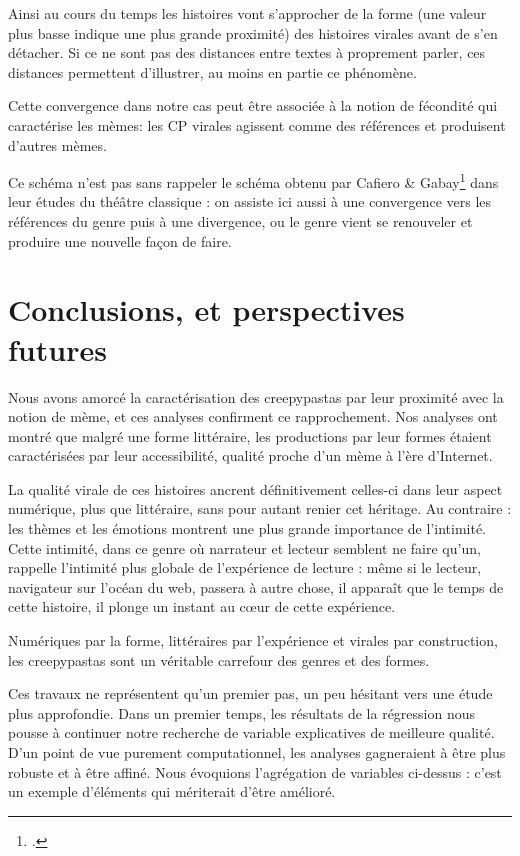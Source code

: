 \documentclass[12pt,a4paper,oneside,titlepage]{book} %
\begin{document}
Ainsi au cours du temps les histoires vont s'approcher de la forme (une valeur plus basse indique une plus grande proximité) des histoires virales avant de s'en détacher. Si ce ne sont pas des distances entre textes à proprement parler, ces distances permettent d'illustrer, au moins en partie ce phénomène. 

Cette convergence dans notre cas peut être associée à la notion de fécondité qui caractérise les mèmes: les CP virales agissent comme des références et produisent d'autres mèmes. 

Ce schéma n'est pas sans rappeler le schéma obtenu par Cafiero \& Gabay\footcite{cafiero_rise_nodate} dans leur études du théâtre classique : on assiste ici aussi à une convergence vers les références du genre puis à une divergence, ou le genre vient se renouveler et produire une nouvelle façon de faire.

\part{Conclusions, et perspectives futures}
Nous avons amorcé la caractérisation des creepypastas par leur proximité avec la notion de mème, et ces analyses confirment ce rapprochement. Nos analyses ont montré que malgré une forme littéraire, les productions par leur formes étaient caractérisées par leur accessibilité, qualité proche d'un mème à l'ère d'Internet. 

La qualité virale de ces histoires ancrent définitivement celles-ci dans leur aspect numérique, plus que littéraire, sans pour autant renier cet héritage. 
Au contraire : les thèmes et les émotions montrent une plus grande importance de l'intimité. Cette intimité, dans ce genre où narrateur et lecteur semblent ne faire qu'un, rappelle l'intimité plus globale de l'expérience de lecture : même si le lecteur, navigateur sur l'océan du web, passera à autre chose, il apparaît que le temps de cette histoire, il plonge un instant au cœur de cette expérience.

Numériques par la forme, littéraires par l'expérience et virales par construction, les creepypastas sont  un véritable carrefour des genres et des formes.

Ces travaux ne représentent qu'un premier pas, un peu hésitant vers une étude plus approfondie. 
Dans un premier temps, les résultats de la régression nous pousse à continuer notre recherche de variable explicatives de meilleure qualité. 
D'un point de vue purement computationnel, les analyses gagneraient à être plus robuste et à être affiné. Nous évoquions l'agrégation de variables ci-dessus : c'est un exemple d'éléments qui mériterait d'être amélioré.
\end{document}
